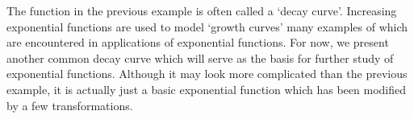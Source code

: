 \medskip

The function in the previous example is often called a `decay curve'.  Increasing exponential functions are used to model `growth curves' many examples of which are encountered in applications of exponential functions.  For now, we present another common decay curve which will serve as the basis for further study of exponential functions.  Although it may look more complicated than the previous example, it is actually just a basic exponential function which has been modified by a few transformations.

\medskip

